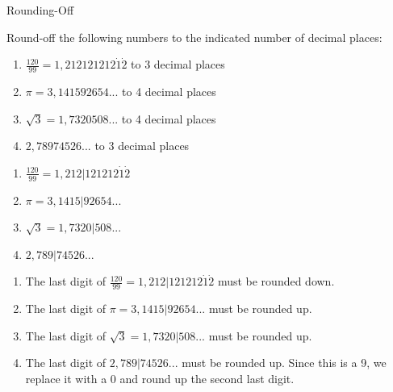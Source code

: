       \begin{wex}{Rounding-Off }
{Round-off the following numbers to the indicated number of decimal places:\par 
      \label{m38349*id325219}\begin{enumerate}[itemsep=5pt, label=\textbf{\arabic*}. ] 
\item $\frac{120}{99}=1,212121212\dot{1}\dot{2}$ to 3 decimal places
\label{m38349*uid6}\item $\pi =3,141592654...$ to 4 decimal places
\label{m38349*uid7}\item $\sqrt{3}=1,7320508...$ to 4 decimal places
\label{m38349*uid789}\item $2,78974526...$ to 3 decimal places\end{enumerate}}
{

\westep{}

\begin{enumerate}[itemsep=5pt, label=\textbf{\arabic*}. ] 
\item  $\frac{120}{99}=1,212|121212\dot{1}\dot{2}$
\item           $\pi =3,1415|92654...$
\item           $\sqrt{3}=1,7320|508...$
\item $2,789|74526...$
\newline
\end{enumerate}
\westep{}
\begin{enumerate}[itemsep=5pt, label=\textbf{\arabic*}. ]
\item The last digit of $\frac{120}{99}=1,212|121212\dot{1}\dot{2}$  must be rounded down.
\item The last digit of $\pi =3,1415|92654...$ must be rounded up.
\item The last digit of $\sqrt{3}=1,7320|508...$ must be rounded up.
\item  The last digit of $2,789|74526...$ must be rounded up. Since this is a 9, we replace it with a 0 and round up the second last digit.
\newline
\end{enumerate}
\westep{}
\begin{enumerate}[itemsep=5pt, label=\textbf{\arabic*}. ]
   

\end{enumerate}}
\end{wex}
